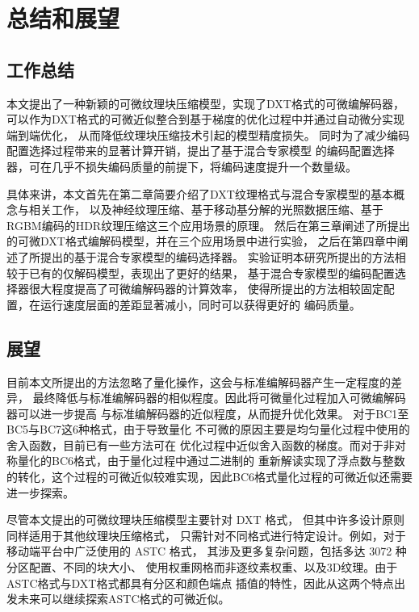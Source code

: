 
\chapter{总结和展望}

\section{工作总结}

本文提出了一种新颖的可微纹理块压缩模型，实现了DXT格式的可微编解码器，
可以作为DXT格式的可微近似整合到基于梯度的优化过程中并通过自动微分实现端到端优化，
从而降低纹理块压缩技术引起的模型精度损失。
同时为了减少编码配置选择过程带来的显著计算开销，提出了基于混合专家模型
的编码配置选择器，可在几乎不损失编码质量的前提下，将编码速度提升一个数量级。

具体来讲，本文首先在第二章简要介绍了DXT纹理格式与混合专家模型的基本概念与相关工作，
以及神经纹理压缩、基于移动基分解的光照数据压缩、基于RGBM编码的HDR纹理压缩这三个应用场景的原理。
然后在第三章阐述了所提出的可微DXT格式编解码模型，并在三个应用场景中进行实验，
之后在第四章中阐述了所提出的基于混合专家模型的编码选择器。
实验证明本研究所提出的方法相较于已有的仅解码模型，表现出了更好的结果，
基于混合专家模型的编码配置选择器很大程度提高了可微编解码器的计算效率，
使得所提出的方法相较固定配置，在运行速度层面的差距显著减小，同时可以获得更好的
编码质量。

\section{展望}

目前本文所提出的方法忽略了量化操作，这会与标准编解码器产生一定程度的差异，
最终降低与标准编解码器的相似程度。因此将可微量化过程加入可微编解码器可以进一步提高
与标准编解码器的近似程度，从而提升优化效果。
对于BC1至BC5与BC7这6种格式，由于导致量化
不可微的原因主要是均匀量化过程中使用的舍入函数，目前已有一些方法可在
优化过程中近似舍入函数的梯度。而对于非对称量化的BC6格式，由于量化过程中通过二进制的
重新解读实现了浮点数与整数的转化，这个过程的可微近似较难实现，因此BC6格式量化过程的可微近似还需要进一步探索。

尽管本文提出的可微纹理块压缩模型主要针对 DXT 格式，
但其中许多设计原则同样适用于其他纹理块压缩格式，
只需针对不同格式进行特定设计。例如，对于移动端平台中广泛使用的 ASTC 格式，
其涉及更多复杂问题，包括多达 3072 种分区配置、不同的块大小、
使用权重网格而非逐纹素权重、以及3D纹理。由于ASTC格式与DXT格式都具有分区和颜色端点
插值的特性，因此从这两个特点出发未来可以继续探索ASTC格式的可微近似。


